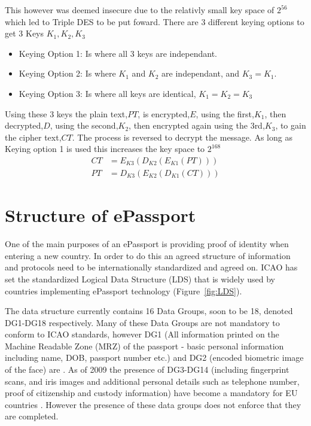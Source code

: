 \documentclass[12pt]{article}
\begin{document}
This however was deemed insecure due to the relativly small key space of $2^{56}$ which led to Triple DES to be put foward. There are 3 different keying options to get 3 Keys $K_1,K_2,K_3$
\begin{itemize}
    \item Keying Option 1: Is where all 3 keys are independant.
    \item Keying Option 2: Is where $K_1$ and $K_2$ are independant, and $K_3 = K_1$.
    \item Keying Option 3: Is where all keys are identical, $K_1 = K_2 = K_3$
\end{itemize}

Using these 3 keys the plain text,$PT$, is encrypted,$E$, using the first,$K_1$, then decrypted,$D$, using the second,$K_2$, then encrypted again using the 3rd,$K_3$, to gain the cipher text,$CT$. The process is reversed to decrypt the message. As long as Keying option 1 is used this increases the key space to $2^{168}$
\begin{align}
    CT &= E_{K3}(D_{K2}(E_{K1}(PT)))\\
    PT &= D_{K3}(E_{K2}(D_{K1}(CT)))
\end{align}
\section{Structure of ePassport}
\label{sec:LDS}
One of the main purposes of an ePassport is providing proof of identity when entering a new country. In order to do this an agreed structure of information and protocols need to be internationally standardized and agreed on. ICAO has set the standardized Logical Data Structure (LDS) that is widely used by countries implementing ePassport technology (Figure~\ref{fig:LDS}).

The data structure currently contains 16 Data Groups, soon to be 18, denoted DG1-DG18 respectively. Many of these Data Groups are not mandatory to conform to ICAO standards, however DG1 (All information printed on the Machine Readable Zone (MRZ) of the passport - basic personal information including name, DOB, passport number etc.) and DG2 (encoded biometric image of the face) are \cite{Anonymous:2006vu}. As of 2009 the presence of DG3-DG14 (including fingerprint scans, and iris images and additional personal details such as telephone number, proof of citizenship and custody information) have become a mandatory for EU countries \cite{Anonymous:2011vj}. However the presence of these data groups does not enforce that they are completed.
\end{document}
